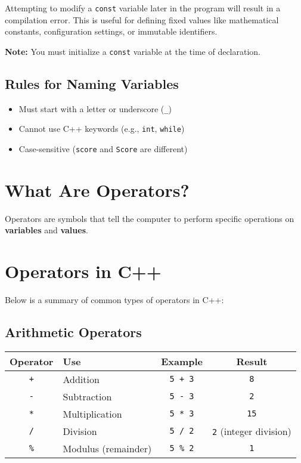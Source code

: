 \documentclass{article}
\begin{document}
Attempting to modify a \texttt{const} variable later in the program will result in a compilation error. This is useful for defining fixed values like mathematical constants, configuration settings, or immutable identifiers.

\textbf{Note:} You must initialize a \texttt{const} variable at the time of declaration.

\subsection*{Rules for Naming Variables}
\begin{itemize}
    \item Must start with a letter or underscore (\texttt{\_})
    \item Cannot use C++ keywords (e.g., \texttt{int}, \texttt{while})
    \item Case-sensitive (\texttt{score} and \texttt{Score} are different)
\end{itemize}

\section{What Are Operators?}

Operators are symbols that tell the computer to perform specific operations on \textbf{variables} and \textbf{values}.

\section*{Operators in C++}

Below is a summary of common types of operators in C++:

\renewcommand{\arraystretch}{1.5}
\setlength{\tabcolsep}{10pt}

\subsection*{Arithmetic Operators}

\begin{center}
\begin{tabular}{|c|l|c|c|}
\hline
\textbf{Operator} & \textbf{Use} & \textbf{Example} & \textbf{Result} \\
\hline
\texttt{+} & Addition & \texttt{5 + 3} & \texttt{8} \\
\hline
\texttt{-} & Subtraction & \texttt{5 - 3} & \texttt{2} \\
\hline
\texttt{*} & Multiplication & \texttt{5 * 3} & \texttt{15} \\
\hline
\texttt{/} & Division & \texttt{5 / 2} & \texttt{2} (integer division) \\
\hline
\texttt{\%} & Modulus (remainder) & \texttt{5 \% 2} & \texttt{1} \\
\hline
\end{tabular}
\end{center}
\end{document}

